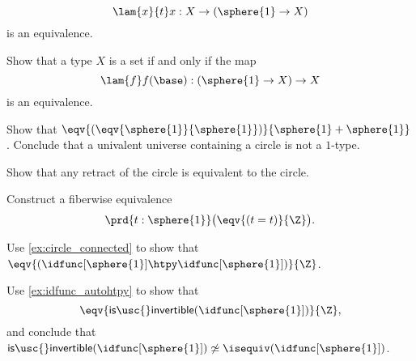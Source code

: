 \begin{exercises}
\begin{subexenum}
\begin{equation*}
\lam{x}{t} x : X \to (\sphere{1}\to X)
\end{equation*}
is an equivalence.
\item Show that a type $X$ is a set if and only if the map
\begin{equation*}
\lam{f}f(\base) : (\sphere{1}\to X)\to X
\end{equation*}
is an equivalence.
\end{subexenum}
\item Show that $\eqv{(\eqv{\sphere{1}}{\sphere{1}})}{\sphere{1}+\sphere{1}}$. Conclude that a univalent universe containing a circle is not a $1$-type.
\item Show that any retract of the circle is equivalent to the circle.
\item 
\begin{subexenum}
\item Construct a fiberwise equivalence
\begin{equation*}
\prd{t:\sphere{1}} \big(\eqv{(t=t)}{\Z}\big).
\end{equation*}
\item Use \cref{ex:circle_connected} to show that $\eqv{(\idfunc[\sphere{1}]\htpy\idfunc[\sphere{1}])}{\Z}$.
\item Use \cref{ex:idfunc_autohtpy} to show that
\begin{equation*}
\eqv{\mathsf{is\usc{}invertible}(\idfunc[\sphere{1}])}{\Z},
\end{equation*}
and conclude that ${\mathsf{is\usc{}invertible}}(\idfunc[\sphere{1}])\not\simeq{\isequiv(\idfunc[\sphere{1}])}$. 
\end{subexenum}
\end{exercises}
